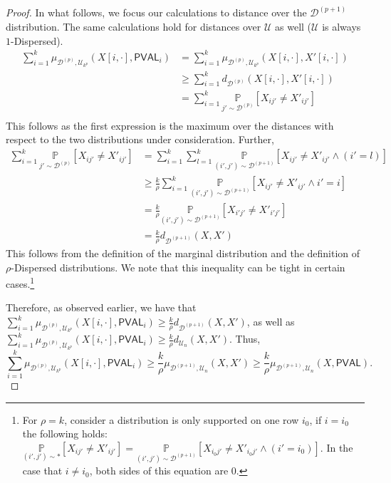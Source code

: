 \documentclass[10pt,a4paper]{article}
\newcommand{\PVAL}{\mathsf{PVAL}}
\newcommand{\sU}{\mathcal{U}}
\newcommand{\sD}{\mathcal{D}}
\begin{document}
\begin{proof}
In what follows, we focus our calculations to distance over the $\sD^{(p+1)}$ distribution. The same calculations hold for distances over $\sU$ as well ($\sU$ is always $1$-Dispersed).
\begin{equation*}
    \begin{split}
        \sum_{i=1}^{k}\mu_{\mathcal{D}^{(p)},\mathcal{U}_{k^{p}}}(X[i,\cdot], \PVAL_{i})&=\sum_{i=1}^{k}\mu_{\mathcal{D}^{(p)}, \mathcal{U}_{k^{p}}}(X[i,\cdot], X'[i,\cdot]) \\
        &\geq \sum_{i=1}^{k}d_{\sD^{(p)}}(X[i,\cdot], X'[i,\cdot])\\
        &= \sum_{i=1}^{k} \underset{j'\sim \sD^{(p)}}{\mathbb{P}}\left[X_{ij'}\neq X'_{ij'}\right]\\
    \end{split}    
\end{equation*}
This follows as the first expression is the maximum over the distances with respect to the two distributions under consideration. Further,
\begin{equation*}
    \begin{split}
        \sum_{i=1}^{k} \underset{j'\sim \sD^{(p)}}{\mathbb{P}}\left[X_{ij'}\neq X'_{ij'}\right]&= \sum_{i=1}^{k}\sum_{l=1}^{k}\underset{(i',j')\sim \mathcal{D}^{(p+1)}}{\mathbb{P}}\left [X_{ij'}\neq X'_{ij'}\wedge (i'=l)\right]\\
        &\geq \frac{k}{\rho}\sum_{i=1}^{k} \underset{(i',j')\sim \sD^{(p+1)}}{\mathbb{P}}\left[X_{ij'}\neq X'_{ij'}\wedge i'=i\right]\\
        &=\frac{k}{\rho}\underset{(i',j')\sim \sD^{(p+1)}}{\mathbb{P}}\left[X_{i'j'}\neq X'_{i'j'}\right]\\
        &=\frac{k}{\rho}d_{\sD^{(p+1)}}(X,X')
    \end{split}
\end{equation*}
This follows from the definition of the marginal distribution and the definition of $\rho$-Dispersed distributions. We note that this inequality can be tight in certain cases.\footnote{For $\rho=k$, consider a distribution is only supported on one row $i_{0}$, if $i=i_{0}$ the following holds: $\underset{(i',j')\sim \ast}{\mathbb{P}}\left[X_{ij'}\neq X'_{ij'}\right]=\underset{(i',j')\sim \mathcal{D}^{(p+1)}}{\mathbb{P}}\left[X_{i_{0}j'}\neq X'_{i_{0}j'}\wedge (i'=i_{0})\right]$. In the case that $i\neq i_{0}$, both sides of this equation are $0$.} 

Therefore, as observed earlier, we have that $\sum_{i=1}^{k}\mu_{\mathcal{D}^{(p)},\mathcal{U}_{k^{p}}}(X[i,\cdot], \PVAL_{i})\geq \frac{k}{\rho}d_{\sD^{(p+1)}}(X,X')$, as well as $\sum_{i=1}^{k}\mu_{\mathcal{D}^{(p)},\mathcal{U}_{k^{p}}}(X[i,\cdot], \PVAL_{i})\geq \frac{k}{\rho}d_{\mathcal{U}_{n}}(X,X')$. Thus, 
\begin{equation*}
    \sum_{i=1}^{k}\mu_{\mathcal{D}^{(p)},\mathcal{U}_{k^{p}}}(X[i,\cdot], \PVAL_{i})\geq \frac{k}{\rho}\mu_{\mathcal{D}^{(p+1)},\mathcal{U}_{n}}(X,X')\geq \frac{k}{\rho}\mu_{\mathcal{D}^{(p+1)},\mathcal{U}_{n}}(X, \PVAL).
\end{equation*}
\end{proof}
\end{document}
